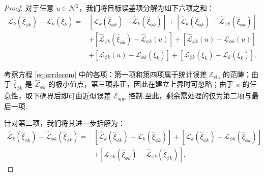\begin{proof}
对于任意 $u\in\mathcal{N}^{2}$，我们将目标误差项分解为如下六项之和：
\begin{equation}\label{eq:errdecom}
\begin{aligned}
\mathcal{L}_{k}(\widehat{\xi}_{\phi k})-\mathcal{L}_{k}\left(\xi_{k}\right)
= & \left[\mathcal{L}_{k}(\widehat{\xi}_{\phi k})-\widehat{\mathcal{L}}_{k}(\widehat{\xi}_{\phi k})\right]
+\left[\widehat{\mathcal{L}}_{k}(\widehat{\xi}_{\phi k})-\widehat{\mathcal{L}}_{\phi k}(\widehat{\xi}_{\phi k})\right] \\
& +\left[\widehat{\mathcal{L}}_{\phi k}(\widehat{\xi}_{\phi k})-\widehat{\mathcal{L}}_{\phi k}(u)\right]
+\left[\widehat{\mathcal{L}}_{\phi k}(u)-\mathcal{L}_{\phi k}(u)\right] \\
& +\left[\mathcal{L}_{\phi k}(u)-\mathcal{L}_{\phi k}\left(\xi_{k}\right)\right]
+\left[\mathcal{L}_{\phi k}\left(\xi_{k}\right)-\mathcal{L}_{k}\left(\xi_{k}\right)\right].
\end{aligned}
\end{equation}

考察方程 \eqref{eq:errdecom} 中的各项：第一项和第四项属于统计误差 $\mathcal{E}_{\text{sta}}$ 的范畴；由于 $\widehat{\xi}_{\phi k}$ 是 $\widehat{\mathcal{L}}_{\phi k}$ 的极小值点，第三项非正，因此在建立上界时可忽略；由于 $u$ 的任意性，取下确界后即可由近似误差 $\mathcal{E}_{\text{app}}$ 控制.至此，剩余需处理的仅为第二项与最后一项.

针对第二项，我们将其进一步拆解为：
\begin{equation}\label{eq:cumerror}
\begin{aligned}
\widehat{\mathcal{L}}_{k}(\widehat{\xi}_{\phi k})-\widehat{\mathcal{L}}_{\phi k}(\widehat{\xi}_{\phi k}) = & \left[\widehat{\mathcal{L}}_{k}(\widehat{\xi}_{\phi k})-\mathcal{L}_{k}(\widehat{\xi}_{\phi k})\right]+
\left[\mathcal{L}_{k}(\widehat{\xi}_{\phi k})-\mathcal{L}_{\phi k}(\widehat{\xi}_{\phi k})\right] \\
& +\left[\mathcal{L}_{\phi k}(\widehat{\xi}_{\phi k})-\widehat{\mathcal{L}}_{\phi k}(\widehat{\xi}_{\phi k})\right].
\end{aligned}
\end{equation}


\end{proof}
